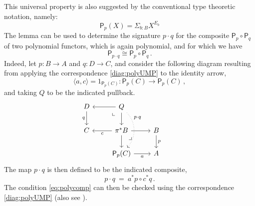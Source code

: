 \documentclass[12pt,reqno]{amsart}
\newcommand{\alg}[1]{\ensuremath{\mathsf{#1}}}
\renewcommand{\to}{\ensuremath{\rightarrow}}
\newcommand{\pbcorner}{\arrow[dr,phantom,"\lrcorner" very near start, shift right=.5ex]} %
\newcommand{\pbcornerright}{\arrow[dl,phantom,"\llcorner" very near start, shift left=.5ex]} %
\theoremstyle{remark}
\theoremstyle{definition}
\begin{document}
This universal property is also suggested by the conventional type theoretic notation, namely: $$\alg{P}_p (X) = \Sigma_{b:B} X^{E_b}$$
The lemma can be used to determine the signature $ p\cdot q $ for the composite $\alg{P}_p \circ \alg{P}_q$ of two polynomial functors, which is again polynomial, and for which we have
\begin{equation}\label{eq:polycomp}
\alg{P}_{p\cdot q} \cong \alg{P}_p \circ \alg{P}_q\,.
\end{equation}
Indeed, let $p : B \to A$ and $q : D \to C$, and consider the following diagram resulting from applying the correspondence \eqref{diag:polyUMP} to the identity arrow,
\[
\langle a, c\rangle = 1_{\alg{P}_p(C)} : \alg{P}_p(C) \to \alg{P}_p(C)\,,
\]
and taking $Q$ to be the indicated pullback.
%
\begin{equation}\label{diag:polyUMP}
\begin{tikzcd}
D \ar[d,swap,"q"] & \ar[l] Q \ar[d] \pbcornerright  \ar[dd, dotted, bend left = 10ex ,near start, "{p\cdot q}"]& & \\
 C  & \ar[l,"c"] \pi^*B \ar[d] \ar[r] \pbcorner & B \ar[d,"p"] \\
&  \alg{P}_p(C) \ar[r,swap,"a"] & A
\end{tikzcd}
\end{equation}
The map $p\cdot q$ is then defined to be the indicated composite,
\[
p\cdot q\ =\ a^*p \circ c^*q\,.
\]
The condition \eqref{eq:polycomp} can then be checked using the correspondence \eqref{diag:polyUMP} (also see \cite{GambinoKoch:2013}).
\end{document}
